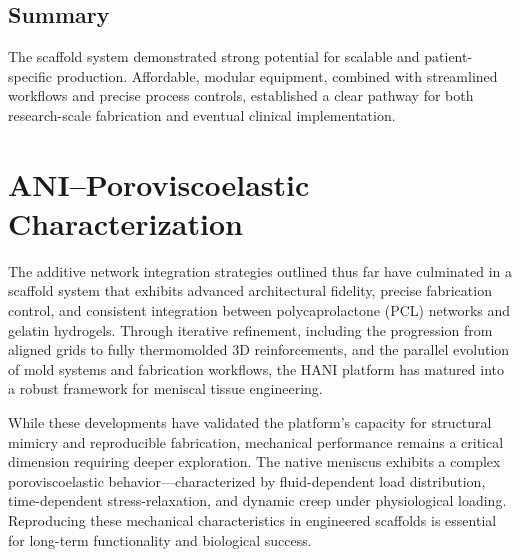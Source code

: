 \subsection{Summary}

The scaffold system demonstrated strong potential for scalable and patient-specific production. Affordable, modular equipment, combined with streamlined workflows and precise process controls, established a clear pathway for both research-scale fabrication and eventual clinical implementation.

% 




\section{ANI–Poroviscoelastic Characterization}

The additive network integration strategies outlined thus far have culminated in a scaffold system that exhibits advanced architectural fidelity, precise fabrication control, and consistent integration between polycaprolactone (PCL) networks and gelatin hydrogels. Through iterative refinement, including the progression from aligned grids to fully thermomolded 3D reinforcements, and the parallel evolution of mold systems and fabrication workflows, the HANI platform has matured into a robust framework for meniscal tissue engineering.

While these developments have validated the platform's capacity for structural mimicry and reproducible fabrication, mechanical performance remains a critical dimension requiring deeper exploration. The native meniscus exhibits a complex poroviscoelastic behavior—characterized by fluid-dependent load distribution, time-dependent stress-relaxation, and dynamic creep under physiological loading. Reproducing these mechanical characteristics in engineered scaffolds is essential for long-term functionality and biological success.

